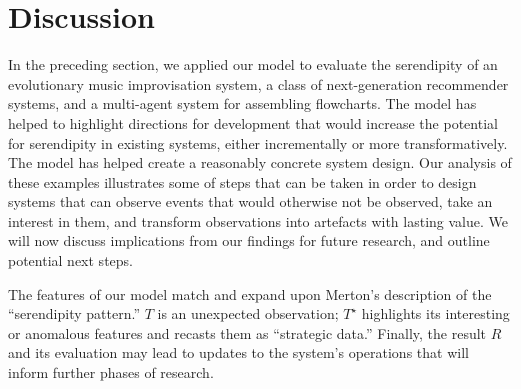 
\section{Discussion} \label{sec:discussion}

In the preceding section, we applied our model to evaluate the serendipity of an evolutionary music improvisation system, a class of next-generation recommender systems, and a multi-agent system for assembling flowcharts.  The model has helped to highlight directions for development that would increase the potential for serendipity in existing systems, either incrementally or more transformatively.  The model has helped create a reasonably concrete system design.  Our analysis of these examples illustrates some of steps that can be taken in order to design systems that can observe events that would otherwise not be observed, take an interest in them, and transform observations into artefacts with lasting value.  We will now discuss implications from our findings for future research, and outline potential next steps.

The features of our model match and expand upon Merton's
\citeyear{merton1948bearing} description of the ``serendipity
pattern.'' $T$ is an unexpected observation; $T^\star$ highlights its
interesting or anomalous features and recasts them as ``strategic
data.''  Finally, the result $R$ and its evaluation may lead to
updates to the system's operations that will inform further phases of
research.  




